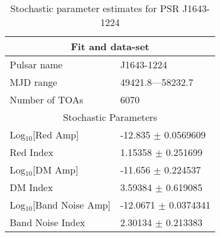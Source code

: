 \documentclass{article}
\begin{document}
\begin{table*}
\caption{Stochastic parameter estimates for PSR J1643-1224}
\begin{tabular}{ll}
\hline\hline
\multicolumn{2}{c}{Fit and data-set} \\ 
\hline
Pulsar name\dotfill & J1643-1224 \\ 
MJD range\dotfill & 49421.8---58232.7 \\ 
Number of TOAs\dotfill & 6070 \\
\hline
\multicolumn{2}{c}{Stochastic Parameters} \\ 
\hline
Log$_{10}$[Red Amp] \dotfill & -12.835 $\pm$ 0.0569609  \\ 
Red Index \dotfill & 1.15358 $\pm$ 0.251699  \\ 
Log$_{10}$[DM Amp] \dotfill & -11.656 $\pm$ 0.224537  \\ 
DM Index \dotfill & 3.59384 $\pm$ 0.619085  \\ 
Log$_{10}$[Band Noise Amp] \dotfill & -12.0671 $\pm$ 0.0374341  \\ 
Band Noise Index \dotfill & 2.30134 $\pm$ 0.213383  \\ 
\hline
\end{tabular}
\label{Table:J1643-1224}
\end{table*} 
\end{document}
